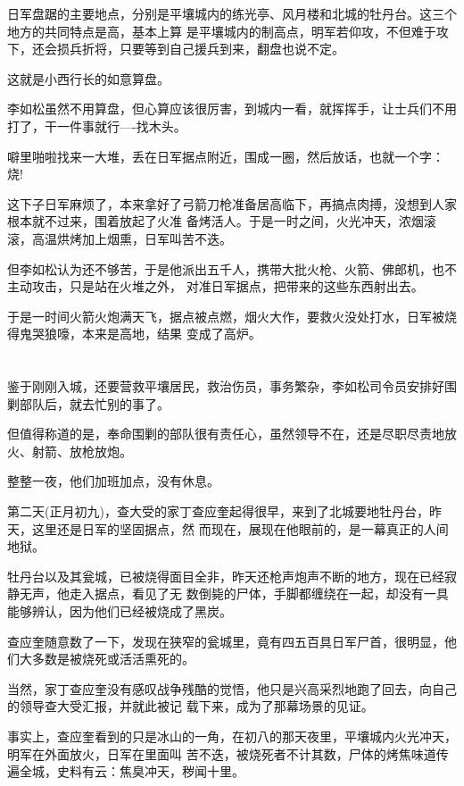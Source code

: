 \documentclass[11pt,a4paper,onecolumn]{article}
\begin{document}
日军盘踞的主要地点，分别是平壤城内的练光亭、风月楼和北城的牡丹台。这三个地方的共同特点是高，基本上算
是平壤城内的制高点，明军若仰攻，不但难于攻下，还会损兵折将，只要等到自己援兵到来，翻盘也说不定。

这就是小西行长的如意算盘。

李如松虽然不用算盘，但心算应该很厉害，到城内一看，就挥挥手，让士兵们不用打了，干一件事就行----找木头。

噼里啪啦找来一大堆，丢在日军据点附近，围成一圈，然后放话，也就一个字：烧!

这下子日军麻烦了，本来拿好了弓箭刀枪准备居高临下，再搞点肉搏，没想到人家根本就不过来，围着放起了火准
备烤活人。于是一时之间，火光冲天，浓烟滚滚，高温烘烤加上烟熏，日军叫苦不迭。

但李如松认为还不够苦，于是他派出五千人，携带大批火枪、火箭、佛郎机，也不主动攻击，只是站在火堆之外，
对准日军据点，把带来的这些东西射出去。

于是一时间火箭火炮满天飞，据点被点燃，烟火大作，要救火没处打水，日军被烧得鬼哭狼嚎，本来是高地，结果
变成了高炉。

\section[\thesection]{}

鉴于刚刚入城，还要营救平壤居民，救治伤员，事务繁杂，李如松司令员安排好围剿部队后，就去忙别的事了。

但值得称道的是，奉命围剿的部队很有责任心，虽然领导不在，还是尽职尽责地放火、射箭、放枪放炮。

整整一夜，他们加班加点，没有休息。

第二天(正月初九)，查大受的家丁查应奎起得很早，来到了北城要地牡丹台，昨天，这里还是日军的坚固据点，然
而现在，展现在他眼前的，是一幕真正的人间地狱。

牡丹台以及其瓮城，已被烧得面目全非，昨天还枪声炮声不断的地方，现在已经寂静无声，他走入据点，看见了无
数倒毙的尸体，手脚都缠绕在一起，却没有一具能够辨认，因为他们已经被烧成了黑炭。

查应奎随意数了一下，发现在狭窄的瓮城里，竟有四五百具日军尸首，很明显，他们大多数是被烧死或活活熏死的。

当然，家丁查应奎没有感叹战争残酷的觉悟，他只是兴高采烈地跑了回去，向自己的领导查大受汇报，并就此被记
载下来，成为了那幕场景的见证。

事实上，查应奎看到的只是冰山的一角，在初八的那天夜里，平壤城内火光冲天，明军在外面放火，日军在里面叫
苦不迭，被烧死者不计其数，尸体的烤焦味道传遍全城，史料有云：焦臭冲天，秽闻十里。
\end{document}
